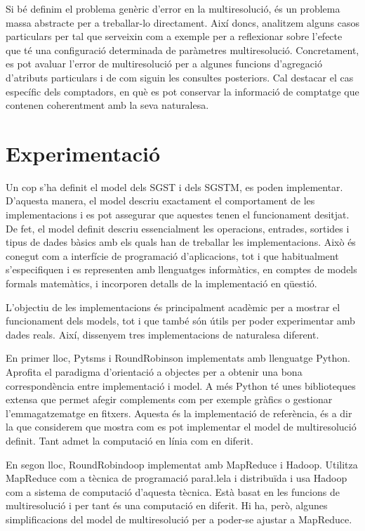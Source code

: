 Si bé definim el problema genèric d'error en la multiresolució, és un
problema massa abstracte per a treballar-lo directament. Així doncs,
analitzem alguns casos particulars per tal que serveixin com a exemple
per a reflexionar sobre l'efecte que té una configuració determinada
de paràmetres multiresolució. Concretament, es pot avaluar l'error de
multiresolució per a algunes funcions d'agregació d'atributs
particulars i de com siguin les consultes posteriors. Cal destacar el
cas específic dels comptadors, en què es pot conservar la informació
de comptatge que contenen coherentment amb la seva naturalesa.



\section{Experimentació}


Un cop s'ha definit el model dels \gls{SGST} i dels \gls{SGSTM}, es
poden implementar. D'aquesta manera, el model descriu exactament el
comportament de les implementacions i es pot assegurar que aquestes
tenen el funcionament desitjat.  De fet, el model definit descriu
essencialment les operacions, entrades, sortides i tipus de dades
bàsics amb els quals han de treballar les implementacions. Això és
conegut com a interfície de programació d'aplicacions, tot i que
habitualment s'especifiquen i es representen amb llenguatges
informàtics, en comptes de models formals matemàtics, i incorporen
detalls de la implementació en qüestió.


L'objectiu de les implementacions és principalment acadèmic per a
mostrar el funcionament dels models, tot i que també són útils per
poder experimentar amb dades reals. Així, dissenyem tres
implementacions de naturalesa diferent. 



En primer lloc, Pytsms i RoundRobinson implementats amb llenguatge
Python.  Aprofita el paradigma d'orientació a objectes per a obtenir
una bona correspondència entre implementació i model. A més Python té
unes biblioteques extensa que permet afegir complements com per
exemple gràfics o gestionar l'emmagatzematge en fitxers.  Aquesta és
la implementació de referència, és a dir la que considerem que mostra
com es pot implementar el model de multiresolució definit.  Tant admet
la computació en línia com en diferit.

En segon lloc, RoundRobindoop implementat amb MapReduce i
Hadoop. Utilitza MapReduce com a tècnica de programació para\l.lela i
distribuïda i usa Hadoop com a sistema de computació d'aquesta
tècnica. Està basat en les funcions de multiresolució i per tant és
una computació en diferit. Hi ha, però, algunes simplificacions del
model de multiresolució per a poder-se ajustar a MapReduce.

